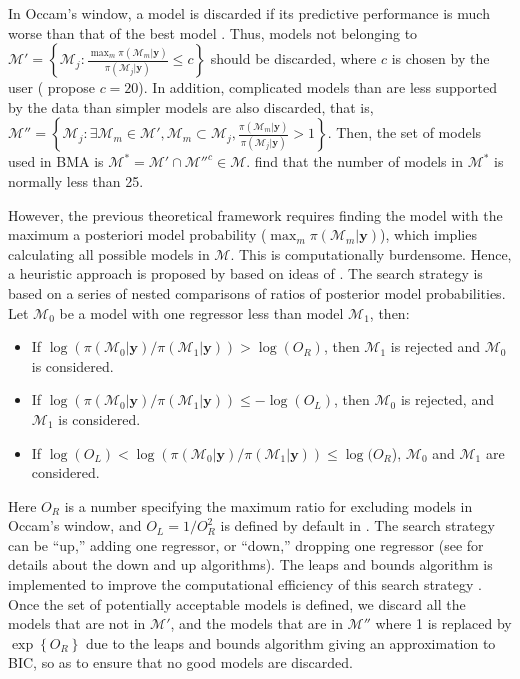 In Occam's window, a model is discarded if its predictive performance is much worse than that of the best model  \cite{Madigan1994,Raftery1997}.
Thus, models not belonging to $\mathcal{M}'=\left\{\mathcal{M}_j:\frac{\max_m {\pi(\mathcal{M}_m|\bm{y})}}{\pi(\mathcal{M}_j|\bm{y})}\leq c\right\}$ should be discarded, where $c$ is chosen by the user (\cite{Madigan1994} propose $c=20$).
In addition, complicated models than are less supported by the data than simpler models are also discarded, that is, $\mathcal{M}''=\left\{\mathcal{M}_j:\exists \mathcal{M}_m\in\mathcal{M}',\mathcal{M}_m\subset \mathcal{M}_j,\frac{\pi(\mathcal{M}_m|\bm{y})}{\pi(\mathcal{M}_j|\bm{y})}>1\right\}$. Then, the set of models used in BMA is $\mathcal{M}^*=\mathcal{M}'\cap \mathcal{M}''^c\in\mathcal{M}$. \cite{Raftery1997} find that the number of models in $\mathcal{M}^*$ is normally less than 25.

However, the previous theoretical framework requires finding the model with the maximum a posteriori model probability ($\max_m {\pi(\mathcal{M}_m|\bm{y})}$), which implies calculating all possible models in $\mathcal{M}$. This is computationally burdensome. Hence, a heuristic approach is proposed by \cite{Raftery2012} based on ideas of \cite{Madigan1994}. The search strategy is based on a series of nested comparisons of ratios of posterior model probabilities. Let $\mathcal{M}_0$ be a model with one regressor less than model $\mathcal{M}_1$, then:
\begin{itemize}
	\item If $\log(\pi(\mathcal{M}_0|\bm{y})/\pi(\mathcal{M}_1|\bm{y}))>\log(O_R)$, then $\mathcal{M}_1$ is rejected and $\mathcal{M}_0$ is considered.
	\item If $\log(\pi(\mathcal{M}_0|\bm{y})/\pi(\mathcal{M}_1|\bm{y}))\leq -\log(O_L)$, then $\mathcal{M}_0$ is rejected, and $\mathcal{M}_1$ is considered.
	 \item If $\log(O_L)<\log(\pi(\mathcal{M}_0|\bm{y})/\pi(\mathcal{M}_1|\bm{y}))\leq \log(O_R$), $\mathcal{M}_0$ and $\mathcal{M}_1$ are considered.
\end{itemize} 
Here $O_R$ is a number specifying the maximum ratio for excluding models in Occam's window, and $O_L=1/O_R^{2}$ is defined by default in \cite{Raftery2012}. The search strategy can be ``up,'' adding one regressor, or ``down,'' dropping one regressor (see \cite{Madigan1994} for details about the down and up algorithms). The leaps and bounds algorithm \cite{Furnival1974} is implemented to improve the computational efficiency of this search strategy \cite{Raftery2012}. Once the set of potentially acceptable models is defined, we discard all the models that are not in $\mathcal{M}'$, and the models that are in $\mathcal{M}''$ where 1 is replaced by $\exp\left\{O_R\right\}$ due to the leaps and bounds algorithm giving an approximation to BIC, so as to ensure that no good models are discarded.

